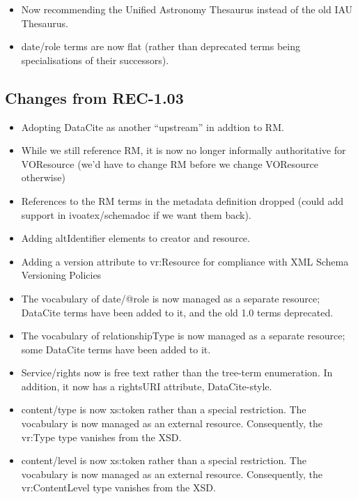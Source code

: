 \documentclass[11pt,a4paper]{ivoa}
\begin{document}
\begin{itemize}
\item Now recommending the Unified Astronomy Thesaurus instead of the
old IAU Thesaurus.
\item date/role terms are now flat (rather than deprecated terms being
specialisations of their successors).
\end{itemize}

\subsection{Changes from REC-1.03}

\begin{itemize}
\item Adopting DataCite as another ``upstream'' in addtion to RM.

\item While we still reference RM, it is now no longer informally
authoritative for VOResource (we'd have to change RM before we change
VOResource otherwise)

\item References to the RM terms in the metadata definition dropped
(could add support in ivoatex/schemadoc if we want them back).

\item Adding altIdentifier elements to creator and resource.

\item Adding a version attribute to vr:Resource for compliance with XML
Schema Versioning Policies

\item The vocabulary of date/@role is now managed as a separate
resource; DataCite terms have been added to it, and the old 1.0 terms
deprecated.

\item The vocabulary of relationshipType is now managed as a separate
resource; some DataCite terms have been added to it.

\item Service/rights now is free text rather than the tree-term
enumeration.  In addition, it now has a rightsURI attribute,
DataCite-style.

\item content/type is now xs:token rather than a special restriction.
The vocabulary is now managed as an external resource.
Consequently, the vr:Type type vanishes from the XSD.

\item content/level is now xs:token rather than a special restriction.
The vocabulary is now managed as an external resource.
Consequently, the vr:ContentLevel type vanishes from the XSD.


\end{itemize}
\end{document}
